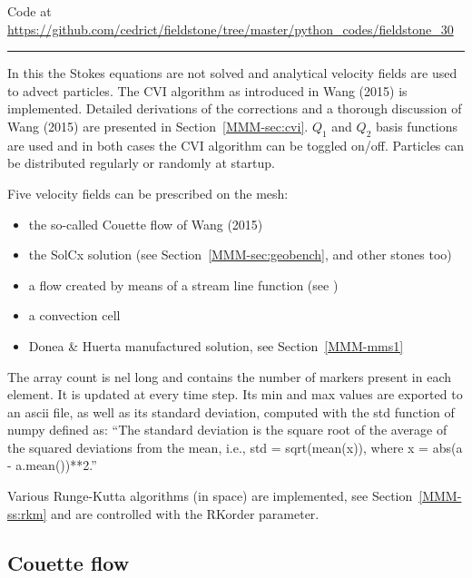 

\begin{center}
Code at \url{https://github.com/cedrict/fieldstone/tree/master/python_codes/fieldstone_30}
\end{center}

\par\noindent\rule{\textwidth}{0.4pt}

In this \stone the Stokes equations are not solved and analytical 
velocity fields are used to advect particles. The CVI algorithm 
as introduced in Wang \etal (2015) \cite{waav15} is implemented.
Detailed derivations of the corrections and a thorough discussion 
of Wang \etal (2015) are presented in Section~\ref{MMM-sec:cvi}.
$Q_1$ and $Q_2$ basis functions are used and in both cases the CVI algorithm can be toggled on/off. 
Particles can be distributed regularly or randomly at startup.

Five velocity fields can be prescribed on the mesh:
\begin{itemize}
\item the so-called Couette flow of Wang \etal (2015) \cite{waav15} 
\item the SolCx solution (see Section~\ref{MMM-sec:geobench}, and  other stones too)
\item a flow created by means of a stream line function (see )
\item a convection cell 
\item Donea \& Huerta manufactured solution, see Section~\ref{MMM-mms1}
\end{itemize}

The array {\python count} is {\python nel} long and contains the number of markers present in each element.
It is updated at every time step. Its min and max values are exported to an ascii file, as well 
as its standard deviation, computed with the {\python std} function of numpy defined as:
``The standard deviation is the square root of the average of the squared deviations from the mean, 
i.e., std = sqrt(mean(x)), where x = abs(a - a.mean())**2.''

Various Runge-Kutta algorithms (in space) are implemented, see Section~\ref{MMM-ss:rkm} and are 
controlled with the {\python RKorder} parameter.

\subsection*{Couette flow}

